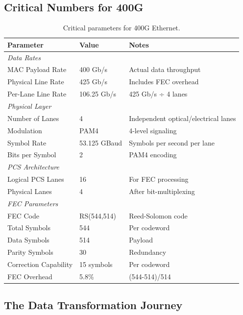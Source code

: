 \documentclass[openany]{tufte-book}
\begin{document}
\subsection{Critical Numbers for 400G}

\begin{fullwidth}
\begin{table}
\centering
\begin{tabular}{lll}
\toprule
\textbf{Parameter} & \textbf{Value} & \textbf{Notes} \\
\midrule
\multicolumn{3}{l}{\textit{Data Rates}} \\
MAC Payload Rate & 400 Gb/s & Actual data throughput \\
Physical Line Rate & 425 Gb/s & Includes FEC overhead \\
Per-Lane Line Rate & 106.25 Gb/s & 425 Gb/s ÷ 4 lanes \\
\midrule
\multicolumn{3}{l}{\textit{Physical Layer}} \\
Number of Lanes & 4 & Independent optical/electrical lanes \\
Modulation & PAM4 & 4-level signaling \\
Symbol Rate & 53.125 GBaud & Symbols per second per lane \\
Bits per Symbol & 2 & PAM4 encoding \\
\midrule
\multicolumn{3}{l}{\textit{PCS Architecture}} \\
Logical PCS Lanes & 16 & For FEC processing \\
Physical Lanes & 4 & After bit-multiplexing \\
\midrule
\multicolumn{3}{l}{\textit{FEC Parameters}} \\
FEC Code & RS(544,514) & Reed-Solomon code \\
Total Symbols & 544 & Per codeword \\
Data Symbols & 514 & Payload \\
Parity Symbols & 30 & Redundancy \\
Correction Capability & 15 symbols & Per codeword \\
FEC Overhead & 5.8\% & (544-514)/514 \\
\bottomrule
\end{tabular}
\caption{Critical parameters for 400G Ethernet.}
\end{table}
\end{fullwidth}

\subsection{The Data Transformation Journey}
\end{document}
